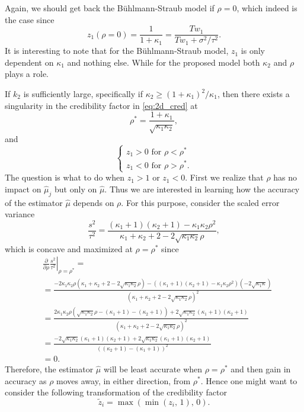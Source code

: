 \documentclass[11pt]{article}
\theoremstyle{definition}
\begin{document}
Again, we should get back the Bühlmann-Straub model if $\rho=0$, which indeed is the case since
\begin{equation*}
    z_1(\rho=0)=\frac{1}{1+\kappa_1} = \frac{Tw_1}{Tw_1+\sigma^2/\tau^2}.
\end{equation*}
It is interesting to note that for the Bühlmann-Straub model, $z_1$ is only dependent on $\kappa_1$ and nothing else. While for the proposed model both $\kappa_2$ and $\rho$ plays a role. 

If $k_2$ is sufficiently large, specifically if $\kappa_2 \geq (1+\kappa_1)^2/\kappa_1$, then there exists a singularity in the credibility factor in \eqref{eq:2d_cred} at
\begin{equation*}
    \rho^\ast = \frac{1+\kappa_1}{\sqrt{\kappa_1\kappa_2}},
\end{equation*}
and
\begin{equation*}
    \begin{cases}
        z_1 > 0 \text{ for } \rho < \rho^\ast \\
        z_1 < 0 \text{ for } \rho > \rho^\ast.
    \end{cases}
\end{equation*}
The question is what to do when $z_1 > 1$ or $z_1 < 0$. First we realize that $\rho$ has no impact on $\hat\mu_j$ but only on $\hat\mu$. Thus we are interested in learning how the accuracy of the estimator $\hat\mu$ depends on $\rho$. For this purpose, consider the scaled error variance
\begin{equation} \label{eq:2d_s2}
    \frac{s^2}{\tau^2} = \frac{(\kappa_1+1)(\kappa_2+1)-\kappa_1\kappa_2\rho^2}{\kappa_1+\kappa_2+2-2\sqrt{\kappa_1\kappa_2}\rho},
\end{equation}
which is concave and maximized at $\rho=\rho^\ast$ since
\begin{equation*}
\begin{aligned}
    &\left.\frac{\partial}{\partial\rho}\frac{s^2}{\tau^2}\right\rvert_{\rho=\rho^\ast} = \\
    &=\frac{-2\kappa_1\kappa_2\rho(\kappa_1+\kappa_2+2-2\sqrt{\kappa_1\kappa_2}\rho)-((\kappa_1+1)(\kappa_2+1)-\kappa_1\kappa_2\rho^2)(-2\sqrt{\kappa_1\kappa})}{(\kappa_1+\kappa_2+2-2\sqrt{\kappa_1\kappa_2}\rho)^2} \\
    &= \frac{2\kappa_1\kappa_2\rho(\sqrt{\kappa_1\kappa_2}\rho-(\kappa_1+1)-(\kappa_2+1))+2\sqrt{\kappa_1\kappa_2}(\kappa_1+1)(\kappa_2+1)}{(\kappa_1+\kappa_2+2-2\sqrt{\kappa_1\kappa_2}\rho)^2} \\
    &= \frac{-2\sqrt{\kappa_1\kappa_2}(\kappa_1+1)(\kappa_2+1)+2\sqrt{\kappa_1\kappa_2}(\kappa_1+1)(\kappa_2+1)}{((\kappa_2+1)-(\kappa_1+1))^2} \\
    &= 0.
\end{aligned}
\end{equation*}
Therefore, the estimator $\hat\mu$ will be least accurate when $\rho=\rho^\ast$ and then gain in accuracy as $\rho$ moves away, in either direction, from $\rho^\ast$. Hence one might want to consider the following transformation of the credibility factor
\begin{equation}\label{eq:2d_z_mod}
    \tilde z_i = \max(\min(z_i,\, 1),\, 0).
\end{equation}
\end{document}
